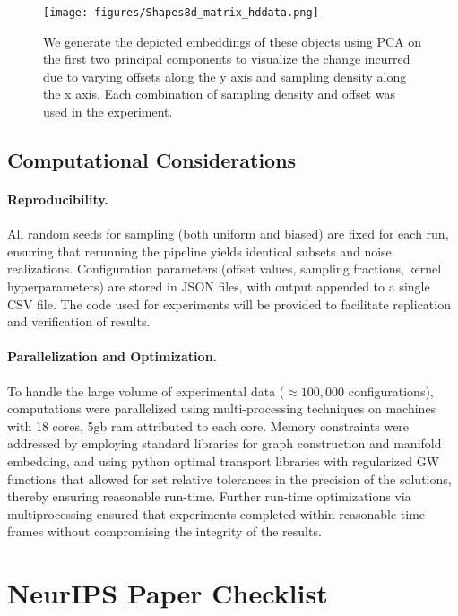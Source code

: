\documentclass{article}
\theoremstyle{plain}
\theoremstyle{definition}
\theoremstyle{remark}
\begin{document}
\begin{figure}[t]
\centering
\texttt{[image: figures/Shapes8d\_matrix\_hddata.png]}
\caption{We generate the depicted embeddings of these objects using PCA on the first two principal components to visualize the change incurred due to varying offsets along the y axis and sampling density along the x axis. Each combination of sampling density and offset was used in the experiment.}
\label{fig:matrix-example}
\end{figure}


\subsection{Computational Considerations}
\label{app:implementation}

\paragraph{Reproducibility.}
All random seeds for sampling (both uniform and biased) are fixed for each run, ensuring that rerunning the pipeline yields identical subsets and noise realizations. Configuration parameters (offset values, sampling fractions, kernel hyperparameters) are stored in JSON files, with output appended to a single CSV file. The code used for experiments will be provided to facilitate replication and verification of results.

\paragraph{Parallelization and Optimization.}
To handle the large volume of experimental data ($\approx 100,000$ configurations), computations were parallelized using multi-processing techniques on machines with 18 cores, 5gb ram attributed to each core. Memory constraints were addressed by employing standard libraries for graph construction and manifold embedding, and using python optimal transport libraries with regularized GW functions that allowed for set relative tolerances in the precision of the solutions, thereby ensuring reasonable run-time. Further run-time optimizations via multiprocessing ensured that experiments completed within reasonable time frames without compromising the integrity of the results.



\newpage
\section*{NeurIPS Paper Checklist}
\end{document}
